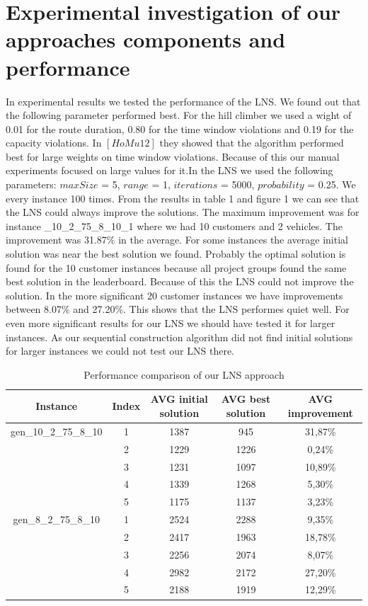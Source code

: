 \documentclass[fleqn]{scrartcl}
\begin{document}
\newpage
\section{Experimental investigation of our approaches components and performance}

In experimental results we tested the performance of the LNS. We found out that the following parameter performed best. For the hill climber we used a wight of 0.01 for the route duration, 0.80 for the time window violations and 0.19 for the capacity violations. In $[HoMu 12]$ they showed that the algorithm performed best for large weights on time window violations. Because of this our manual experiments focused on large values for it.In the LNS we used the following parameters: $maxSize$ = 5, $range$ = 1, $iterations$ = 5000, $probability$ = 0.25. We every instance 100 times. From the results in table 1 and figure 1 we can see that the LNS could always improve the solutions. The maximum improvement was for instance \_10\_2\_75\_8\_10\_1 where we had 10 customers and 2 vehicles. The improvement was 31.87\% in the average. For some instances the average initial solution was near the best solution we found. Probably the optimal solution is found for the 10 customer instances because all project groups found the same best solution in the leaderboard. Because of this the LNS could not improve the solution. In the more significant 20 customer instances we have improvements between 8.07\% and 27.20\%. This shows that the LNS performes quiet well. For even more significant results for our LNS we should have tested it for larger instances. As our sequential construction algorithm did not find initial solutions for larger instances we could not test our LNS there. 

\begin{table}[H]
\begin{tabular}{|c|c|c|c|c|}
\hline 
Instance & Index & AVG initial solution & AVG best solution & AVG improvement \\ 
\hline 
gen\_10\_2\_75\_8\_10 & 1 & 1387 & 945 & 31,87\% \\ 
\hline 
& 2 & 1229 & 1226 & 0,24\% \\ 
\hline 
& 3 & 1231 & 1097 & 10,89\% \\ 
\hline 
& 4 & 1339 & 1268 & 5,30\% \\ 
\hline 
& 5 & 1175 & 1137 & 3,23\% \\ 
\hline 
gen\_8\_2\_75\_8\_10 & 1 & 2524 & 2288 & 9,35\% \\ 
\hline 
& 2 & 2417 & 1963 & 18,78\% \\ 
\hline 
& 3 & 2256 & 2074 & 8,07\% \\ 
\hline 
& 4 & 2982 & 2172 & 27,20\% \\ 
\hline 
& 5 & 2188 & 1919 & 12,29\% \\ 
\hline 
\end{tabular}
\caption{Performance comparison of our LNS approach}
\label{tab:performance}
\end{table}
\end{document}
